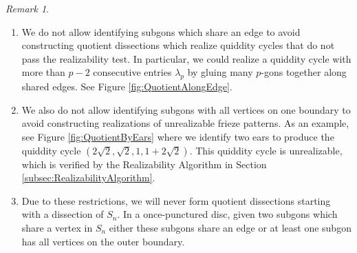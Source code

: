 \documentclass[12pt]{article}
\theoremstyle{remark}
\newtheorem{remark}{Remark}
\begin{document}
\begin{remark}
\begin{enumerate}
\item We do not allow identifying subgons which share an edge to avoid constructing quotient dissections which realize quiddity cycles that do not pass the realizability test. In particular, we could realize a quiddity cycle with more than $p-2$ consecutive entries $\lambda_p$ by gluing many $p$-gons together along shared edges. See Figure \ref{fig:QuotientAlongEdge}.
\item We also do not allow identifying subgons with all vertices on one boundary to avoid constructing realizations of unrealizable frieze patterns. As an example, see Figure \ref{fig:QuotientByEars} where we identify two ears to produce the quiddity cycle  $(2\sqrt{2},\sqrt{2},1,1+2\sqrt{2})$. This quiddity cycle is unrealizable, which is verified by the Realizability Algorithm in Section \ref{subsec:RealizabilityAlgorithm}. 
\item Due to these restrictions, we will never form quotient dissections starting with a dissection of $S_n$. In a once-punctured disc, given two subgons which share a vertex in $S_n$ either these subgons share an edge or at least one subgon has all vertices on the outer boundary. 
\end{enumerate}
\end{remark}
\end{document}
